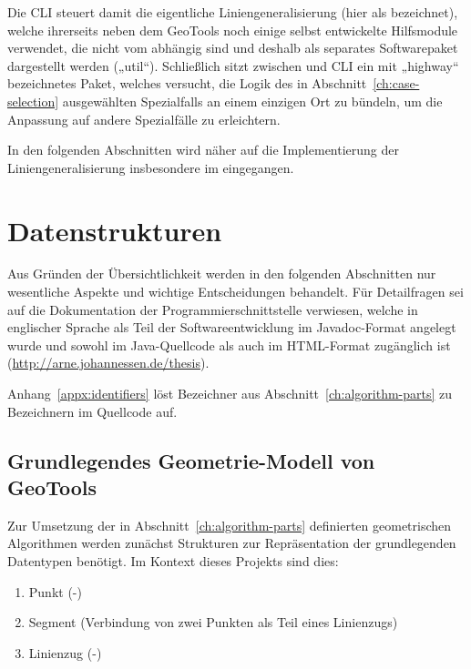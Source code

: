 \documentclass[../main/thesis.tex]{subfiles}
\begin{document}
Die CLI steuert damit die eigentliche Liniengeneralisierung (hier als  bezeichnet), welche ihrerseits neben dem  GeoTools noch einige selbst entwickelte Hilfsmodule verwendet, die nicht vom  abhängig sind und deshalb als separates Softwarepaket dargestellt werden („util“).
Schließlich sitzt zwischen  und CLI ein mit „highway“ bezeichnetes Paket, welches versucht, die Logik des in Abschnitt~\ref{ch:case-selection} ausgewählten Spezialfalls an einem einzigen Ort zu bündeln, um die Anpassung auf andere Spezialfälle zu erleichtern.


In den folgenden Abschnitten wird näher auf die Implementierung der Liniengeneralisierung insbesondere im  eingegangen.



\section{Datenstrukturen}
\label{ch:data-structures}


Aus Gründen der Übersichtlichkeit werden in den folgenden Abschnitten nur wesentliche Aspekte und wichtige Entscheidungen behandelt.
Für Detailfragen sei auf die Dokumentation der Programmierschnittstelle verwiesen, welche in englischer Sprache als Teil der Softwareentwicklung im Javadoc-Format angelegt wurde und sowohl im Java-Quellcode als auch im HTML-Format zugänglich ist (\url{http://arne.johannessen.de/thesis}).

Anhang~\ref{appx:identifiers} löst Bezeichner aus Abschnitt~\ref{ch:algorithm-parts} zu Bezeichnern im Quellcode auf.



\subsection{Grundlegendes Geometrie-Modell von GeoTools}
\label{ch:data-structures-geotools}

Zur Umsetzung der in Abschnitt~\ref{ch:algorithm-parts} definierten geometrischen Algorithmen werden zunächst Strukturen zur Repräsentation der grundlegenden Datentypen benötigt.
Im Kontext dieses Projekts sind dies:
\begin{enumerate}[nosep]
	\item Punkt (\osm-)
	\item Segment (Verbindung von zwei Punkten als Teil eines Linienzugs)
	\item Linienzug (\osm-)
\end{enumerate}
\end{document}
